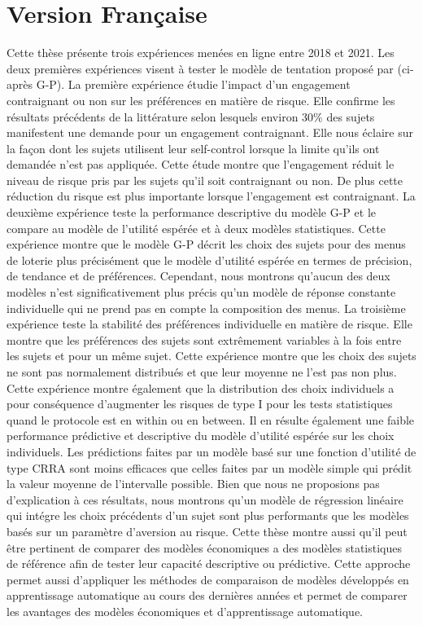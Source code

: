 \documentclass[
]{book}
\begin{document}
\hypertarget{version-franuxe7aise}{%
\section*{Version Française}\label{version-franuxe7aise}}

Cette thèse présente trois expériences menées en ligne entre 2018 et 2021.
Les deux premières expériences visent à tester le modèle de tentation proposé
par \citet{gul2001temptation} (ci-après G-P).
La première expérience étudie l'impact d'un engagement contraignant ou non sur
les préférences en matière de risque.
Elle confirme les résultats précédents de la littérature selon
lesquels environ 30\% des sujets manifestent une demande pour un engagement
contraignant.
Elle nous éclaire sur la façon dont les sujets utilisent leur
self-control lorsque la limite qu'ils ont demandée n'est pas appliquée.
Cette étude montre que l'engagement réduit le niveau de
risque pris par les sujets qu'il soit contraignant ou non.
De plus cette réduction du risque est plus importante lorsque l'engagement est
contraignant.
La deuxième expérience teste la performance descriptive du modèle G-P
et le compare au modèle de l'utilité espérée et à deux modèles statistiques.
Cette expérience montre que le modèle G-P décrit les choix des
sujets pour des menus de loterie plus précisément que le modèle d'utilité
espérée en termes de précision, de tendance et de préférences.
Cependant, nous montrons qu'aucun des deux modèles n'est significativement plus
précis qu'un modèle de réponse constante individuelle qui ne prend pas en compte
la composition des menus.
La troisième expérience teste la stabilité des préférences individuelle en
matière de risque.
Elle montre que les préférences des sujets sont extrêmement variables à la fois
entre les sujets et pour un même sujet.
Cette expérience montre que les choix des sujets ne sont pas normalement
distribués et que leur moyenne ne l'est pas non plus.
Cette expérience montre également que la distribution des choix individuels
a pour conséquence d'augmenter les risques de type I pour les tests statistiques
quand le protocole est en within ou en between.
Il en résulte également une faible performance prédictive et descriptive du
modèle d'utilité espérée sur les choix individuels.
Les prédictions faites par un modèle basé sur une fonction d'utilité de type
CRRA sont moins efficaces que celles faites par un modèle simple qui prédit
la valeur moyenne de l'intervalle possible.
Bien que nous ne proposions pas d'explication à ces résultats, nous montrons
qu'un modèle de régression linéaire qui intégre les choix précédents d'un sujet
sont plus performants que les modèles basés sur un paramètre d'aversion au
risque.
Cette thèse montre aussi qu'il peut être pertinent de comparer des modèles
économiques a des modèles statistiques de référence afin de tester leur capacité
descriptive ou prédictive.
Cette approche permet aussi d'appliquer les méthodes de comparaison de modèles
développés en apprentissage automatique au cours des dernières années et permet
de comparer les avantages des modèles économiques et d'apprentissage automatique.
\end{document}
